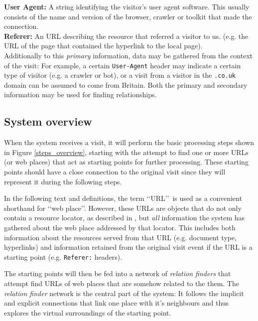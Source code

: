 \documentclass[a4paper]{danarticle}
\theoremstyle{remark}
\begin{document}
    \textbf{User Agent:} A string identifying the visitor's user agent 
    software. This usually consists of the name and version of the browser, 
    crawler or toolkit that made the connection.
    \\
    
    \textbf{Referer:} An URL describing the resource that referred a visitor to
    us. (e.g. the URL of the page that contained the hyperlink to the 
    local page).
    \\
    
    Additionally to
    this \textit{primary} information, data may be gathered from the
    context of the visit: For example, a certain \verb$User-Agent$ header 
    may indicate a certain type of visitor (e.g. a crawler or bot), or a visit
    from a visitor in the \verb$.co.uk$ domain can be assumed to come from
    Britain. Both the primary and secondary information may be used for finding
    relationships.
    \subsection{System overview}
      When the system receives a visit, it will perform the basic processing
      steps shown in Figure \ref{steps_overview}, starting with the 
      attempt to find one or 
      more URLs (or web places) that act as starting points for further 
      processing. These 
      starting points should have a close connection to the original visit since 
      they will represent it during the following steps.
      
      In the following text and definitions, the term \lq\lq URL\rq\rq\ 
      is used as a convenient shorthand for \lq\lq web place\rq\rq . However, 
      these URLs are objects that 
      do not only contain a resource locator, as described 
      in \cite{url}, but \emph{all} information the system has gathered about 
      the web place addressed by that locator. This includes both information 
      about  the resources served from that URL (e.g. document type, hyperlinks) 
      and information retained from the original visit event if the URL is a 
      starting point (e.g. \verb$Referer:$ headers).
      
      The starting points will then be fed into a network of \textit{relation 
      finders} that attempt find URLs of web places that are somehow related to 
      the them. The \textit{relation finder} network is the central part of the 
      system: It follows the implicit and explicit connections that link one 
      place with it's neighbours and thus explores the virtual surroundings of 
      the starting point. 
      
\end{document}
